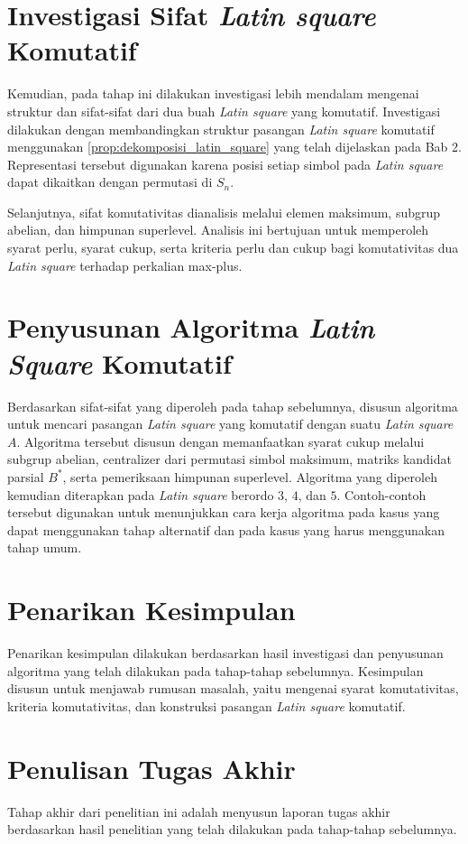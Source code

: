 \section{Investigasi Sifat \textit{Latin square} Komutatif}
Kemudian, pada tahap ini dilakukan investigasi lebih mendalam mengenai struktur dan sifat-sifat dari dua buah \textit{Latin square} yang komutatif. Investigasi dilakukan dengan membandingkan struktur pasangan \textit{Latin square} komutatif menggunakan \autoref{prop:dekomposisi_latin_square} yang telah dijelaskan pada Bab 2. Representasi tersebut digunakan karena posisi setiap simbol pada \textit{Latin square} dapat dikaitkan dengan permutasi di $S_n$.

Selanjutnya, sifat komutativitas dianalisis melalui elemen maksimum, subgrup abelian, dan himpunan superlevel. Analisis ini bertujuan untuk memperoleh syarat perlu, syarat cukup, serta kriteria perlu dan cukup bagi komutativitas dua \textit{Latin square} terhadap perkalian max-plus.

\section{Penyusunan Algoritma \textit{Latin Square} Komutatif}
Berdasarkan sifat-sifat yang diperoleh pada tahap sebelumnya, disusun algoritma untuk mencari pasangan \textit{Latin square} yang komutatif dengan suatu \textit{Latin square} $A$. Algoritma tersebut disusun dengan memanfaatkan syarat cukup melalui subgrup abelian, centralizer dari permutasi simbol maksimum, matriks kandidat parsial $B^*$, serta pemeriksaan himpunan superlevel. Algoritma yang diperoleh kemudian diterapkan pada \textit{Latin square} berordo $3$, $4$, dan $5$. Contoh-contoh tersebut digunakan untuk menunjukkan cara kerja algoritma pada kasus yang dapat menggunakan tahap alternatif dan pada kasus yang harus menggunakan tahap umum.

\section{Penarikan Kesimpulan}
Penarikan kesimpulan dilakukan berdasarkan hasil investigasi dan penyusunan algoritma yang telah dilakukan pada tahap-tahap sebelumnya. Kesimpulan disusun untuk menjawab rumusan masalah, yaitu mengenai syarat komutativitas, kriteria komutativitas, dan konstruksi pasangan \textit{Latin square} komutatif.

\section{Penulisan Tugas Akhir}
Tahap akhir dari penelitian ini adalah menyusun laporan tugas akhir berdasarkan hasil penelitian yang telah dilakukan pada tahap-tahap sebelumnya.

